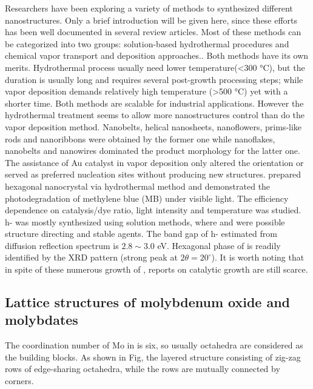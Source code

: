 Researchers have been exploring a variety of methods to synthesized different  nanostructures. Only a brief introduction will be given here, since these efforts has been well documented in several review articles.\cite{He2003} Most of these methods can be categorized into two groups: solution-based hydrothermal procedures \citep{Li2002b,Xia2006,Li2006a,Camacho-Bragado2006} and chemical vapor transport and deposition approaches.\citep{Zeng1998,Li2002c,Li2002d,Zhou2003b,Fibers2007,Yan2009}. Both methods have its own merits. Hydrothermal process usually need lower temperature(\textless 300 \si{\degreeCelsius}), but the duration is usually long and requires several post-growth processing steps; while vapor deposition demands relatively high temperature (\textgreater 500 \si{\degreeCelsius}) yet with a shorter time. Both methods are scalable for industrial applications. However the hydrothermal treatment seems to allow more  nanostructures control than do the vapor deposition method. Nanobelts,\cite{Li2002b} helical nanosheets, nanoflowers, prims-like rods\cite{Li2006a} and nanoribbons\cite{Camacho-Bragado2006} were obtained by the former one while nanoflakes,\cite{Chen2009} nanobelts\cite{Hu2009} and nanowires\citep{Zhou2003b,Chen2011b} dominated the product morphology for the latter one. The assistance of Au catalyst in vapor deposition only altered the orientation\cite{Yan2009} or served as preferred nucleation sites\cite{Cai2011} without producing new  structures. \citeauthor{Chithambararaj2013} prepared hexagonal  nanocrystal via hydrothermal method and demonstrated the photodegradation of methylene blue (MB) under visible light.\cite{Chithambararaj2013} The efficiency dependence on catalysis/dye ratio, light intensity and temperature was studied. h- was mostly synthesized using solution methods, where  and  were possible structure directing and stable agents. The band gap of h- estimated from diffusion reflection spectrum is $2.8\sim3.0$ eV. Hexagonal phase of  is readily identified by the XRD pattern (strong peak at $2\theta=20^{\circ}$). It is worth noting that in spite of these numerous growth of , reports on catalytic growth are still scarce. 

\subsection{Lattice structures of molybdenum oxide and molybdates}

The coordination number of Mo in  is six, so usually  octahedra are considered as the building blocks. As shown in Fig, the layered structure consisting of zig-zag rows of edge-sharing  octahedra, while the rows are mutually connected by corners.

